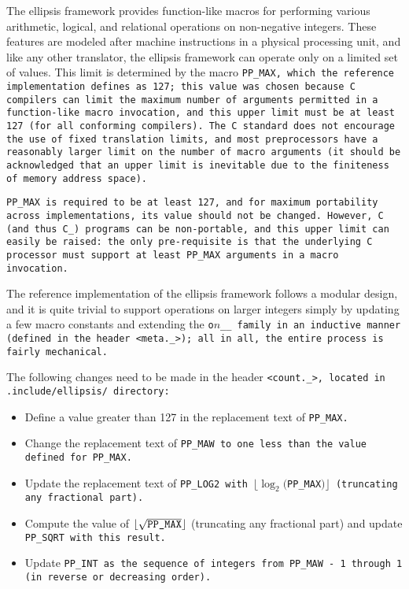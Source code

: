 The ellipsis framework provides function-like macros for performing various
arithmetic, logical, and relational operations on non-negative integers.
These features are modeled after machine instructions in
a physical processing unit, and like any other translator,
the ellipsis framework can operate only on a limited set of values.
This limit is determined by the macro \tt{PP_MAX}, which the reference
implementation defines as 127; this value was chosen because C compilers can limit
the maximum number of arguments permitted in a function-like macro invocation,
and this upper limit must be at least 127 (for all conforming compilers).
The C standard does not encourage the use of fixed translation limits,
and most preprocessors have a reasonably larger limit on the number
of macro arguments (it should be acknowledged that an upper limit
is inevitable due to the finiteness of memory address space).

\tt{PP_MAX} is required to be at least 127, and for maximum
portability across implementations, its value should not be changed.
However, C (and thus C\_) programs can be non-portable, and this upper
limit can easily be raised: the only pre-requisite is that the underlying C
processor must support at least \tt{PP_MAX} arguments in a macro invocation.

The reference implementation of the ellipsis framework follows a modular design,
and it is quite trivial to support operations on larger integers simply
by updating a few macro constants and extending the \tt{o}$n$\_\_
family in an inductive manner (defined in the header \tt{<meta._>});
all in all, the entire process is fairly mechanical.

The following changes need to be made in the header \tt{<count._>},
located in \tt{.include/ellipsis/} directory:

\begin{itemize}

\item Define a value greater than 127 in the replacement text of \tt{PP_MAX}.

\item Change the replacement text  of  \tt{PP_MAW}
to one less than the value defined for \tt{PP_MAX}.

\item Update the replacement text of \tt{PP_LOG2} with
$\lfloor\log_2($\tt{PP_MAX}$)\rfloor$ (truncating any fractional part).

\item Compute the value of $\lfloor\sqrt{\verb|PP_MAX|}\rfloor$
(truncating any fractional part) and update \tt{PP_SQRT} with this result.

\item Update \tt{PP_INT} as the sequence of integers from
\tt{PP_MAW} - 1 through 1 (in reverse or decreasing order).

\end{itemize}

